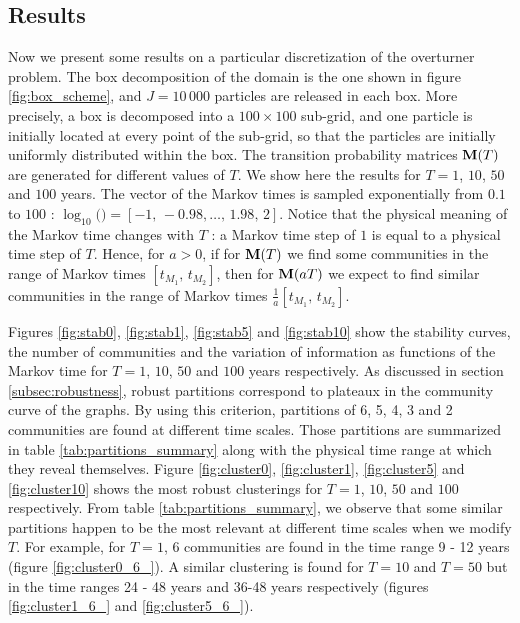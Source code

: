 \subsection{Results}
Now we present some results on a particular discretization of the overturner problem. The box decomposition of the domain is the one shown in figure \ref{fig:box_scheme}, and $J = 10\,000$ particles are released in each box. More precisely, a box is decomposed into a $100 \times 100$ sub-grid, and one particle is initially located at every point of the sub-grid, so that the particles are initially uniformly distributed within the box. The transition probability matrices $\mathbf M(T)$ are generated for different values of $T$. We show here the results for $T = 1$, $10$, $50$ and $100$ years. The vector of the Markov times  is sampled exponentially from $0.1$ to $100$ : $\log_{10}($$) = [-1,\, -0.98, \dots ,\, 1.98,\, 2]$. Notice that the physical meaning of the Markov time changes with $T$ : a Markov time step of $1$ is equal to a physical time step of $T$. Hence, for $a >0$, if for $\mathbf M(T)$ we find some communities in the range of Markov times $[t_{M_1},\, t_{M_2}]$, then for $\mathbf M(aT)$ we expect to find similar communities in the range of Markov times $\frac{1}{a}[t_{M_1},\, t_{M_2}]$.

% 	

Figures \ref{fig:stab0}, \ref{fig:stab1}, \ref{fig:stab5} and \ref{fig:stab10} show the stability curves, the number of communities and the variation of information as functions of the Markov time for $T = 1$, $10$, $50$ and $100$ years respectively. As discussed in section \ref{subsec:robustness}, robust partitions correspond to plateaux in the community curve of the graphs. By using this criterion, partitions of 6, 5, 4, 3 and 2 communities are found at different time scales. Those partitions are summarized in table \ref{tab:partitions_summary} along with the physical time range at which they reveal themselves. Figure \ref{fig:cluster0}, \ref{fig:cluster1}, \ref{fig:cluster5} and \ref{fig:cluster10} shows the most robust clusterings for $T=1$, $10$, $50$ and $100$ respectively. From table \ref{tab:partitions_summary}, we observe that some similar partitions happen to be the most relevant at different time scales when we modify $T$. For example, for $T=1$, 6 communities are found in the time range 9 - 12 years (figure \ref{fig:cluster0_6_}). A similar clustering is found for $T = 10$ and $T = 50$ but in the time ranges 24 - 48 years and 36-48 years respectively (figures \ref{fig:cluster1_6_} and \ref{fig:cluster5_6_}).


